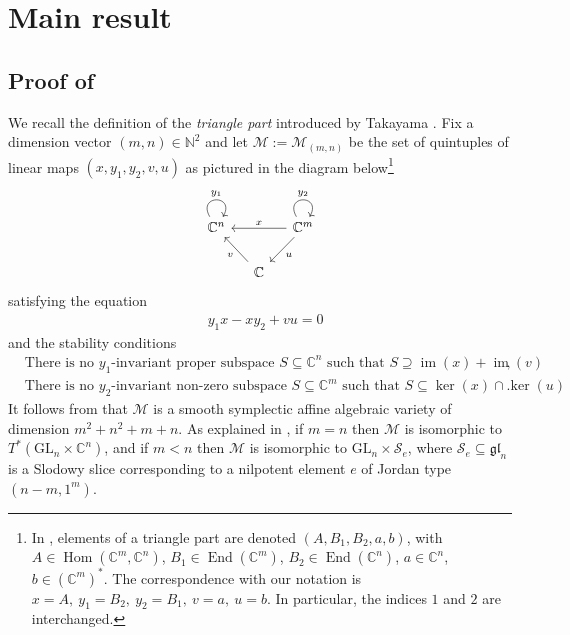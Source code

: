 \documentclass[11pt]{article}
\theoremstyle{definition}
\theoremstyle{plain}
\theoremstyle{remark}
\newcommand{\GL}{\mathrm{GL}}
\newcommand{\numberset}{\mathbb}
\newcommand{\C}{\numberset{C}}
\newcommand{\N}{\numberset{N}}
\DeclareMathOperator{\im}{im}
\newcommand{\gl}{\mathfrak{gl}}
\DeclareMathOperator{\Hom}{Hom}
\DeclareMathOperator{\End}{End}
\begin{document}
    \section{Main result}\label{section-mainthm}

        \subsection{Proof of \texorpdfstring{}{Theorem 2.1}}

        We recall the definition of the \emph{triangle part} introduced by Takayama \cite{Takayama2016}. Fix a dimension vector $(m,n) \in \N^2$ and let $\mathcal{M} := \mathcal{M}_{(m,n)}$ be the set of quintuples of linear maps $(x,y_1,y_2,v,u)$ as pictured in the diagram below\footnote{In \cite{NakajimaTakayama2017}, elements of a triangle part are denoted $(A,B_1,B_2,a,b)$, with $A \in \Hom(\C^m,\C^n)$, $B_1 \in \End(\C^m)$, $B_2 \in \End(\C^n)$, $a \in \C^n$, $b \in (\C^m)^*$. The correspondence with our notation is $x=A,\ y_1 = B_2,\ y_2 = B_1,\ v = a,\ u=b$. In particular, the indices $1$ and $2$ are interchanged.}
        \[
            \begin{tikzcd}[column sep = small]
                \C^n  \arrow[out=120,in=60,loop,looseness=5,"y_1"] & & \C^m \arrow[ll, "x"']\arrow[out=120,in=60,loop,looseness=5,"y_2"] \arrow[ld, "u"] \\
                & \C \arrow[lu, "v"]& 
            \end{tikzcd}
        \]
        satisfying the equation
        \begin{align}
            & y_1x-xy_2+vu=0 \label{eq-condition0}
        \end{align}
        and the stability conditions
        \begin{align}
            & \text{There is no $y_1$-invariant proper subspace $S \subseteq \C^n$ such that $S \supseteq \im(x)+\im(v)$}, \label{eq-condition1} \\
            & \text{There is no $y_2$-invariant non-zero subspace $S \subseteq \C^m$ such that $S \subseteq \ker(x) \cap\ker(u)$}. \label{eq-condition2}
        \end{align}
        It follows from \cite[Prop. 2.9]{Takayama2016} that $\mathcal{M}$ is a smooth symplectic affine algebraic variety of dimension $m^2+n^2 +m +n$. As explained in \cite[Section 3.1]{NakajimaTakayama2017}, if $m=n$ then $\mathcal{M}$ is isomorphic to $T^*(\GL_n \times \C^n)$, and if $m<n$ then $\mathcal{M}$ is isomorphic to $\GL_n \times \mathcal{S}_e$, where $\mathcal{S}_e \subseteq \gl_n$ is a Slodowy slice corresponding to a nilpotent element $e$ of Jordan type $(n-m,1^m)$.
        
\end{document}
